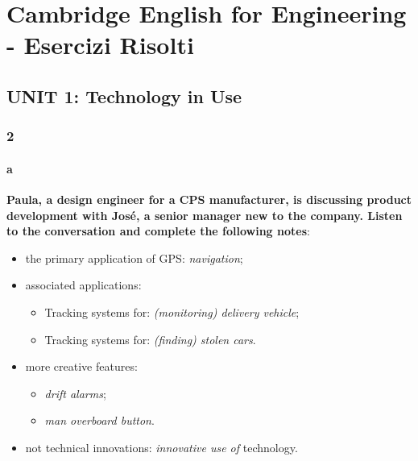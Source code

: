 
\chapter{Cambridge English for Engineering - Esercizi Risolti}
\label{cap:cmbeng}

\section{UNIT 1: Technology in Use}

\subsection{2}

\subsubsection{a}

\textbf{Paula, a design engineer for a CPS manufacturer, is discussing product development with José, a senior manager new to the company. Listen to the conversation and complete the following notes}:

\begin{itemize}

\item the primary application of GPS: \textit{navigation};
\item associated applications:

\begin{itemize}
\item Tracking systems for: \textit{(monitoring) delivery vehicle};
\item Tracking systems for: \textit{(finding) stolen cars}.
\end{itemize}

\item more creative features:

\begin{itemize}
\item \textit{drift alarms};
\item \textit{man overboard button}.
\end{itemize}

\item not technical innovations: \textit{innovative use of} technology.

\end{itemize}

